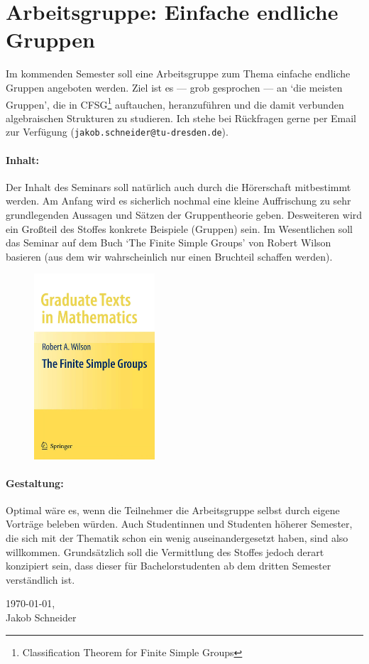 \documentclass{article}
\begin{document}
\section*{Arbeitsgruppe: Einfache endliche Gruppen}

Im kommenden Semester soll eine Arbeitsgruppe zum Thema einfache endliche Gruppen angeboten werden. Ziel ist es --- grob gesprochen --- an `die meisten Gruppen', die in CFSG\footnote{Classification Theorem for Finite Simple Groups}  auftauchen, heranzuführen und die damit verbunden algebraischen Strukturen zu studieren.
Ich stehe bei Rückfragen gerne per Email zur Verfügung ({\tt jakob.schneider@tu-dresden.de}).

\paragraph{Inhalt:} Der Inhalt des Seminars soll natürlich auch durch die Hörerschaft mitbestimmt werden.
Am Anfang wird es sicherlich nochmal eine kleine Auffrischung zu sehr grundlegenden Aussagen und Sätzen der Gruppentheorie geben.
Desweiteren wird ein Großteil des Stoffes konkrete Beispiele (Gruppen) sein. Im Wesentlichen soll das Seminar auf dem Buch `The Finite Simple Groups' von Robert Wilson
basieren (aus dem wir wahrscheinlich nur einen Bruchteil schaffen werden).

\begin{figure}[htb]
    \centering
    \includegraphics[width=0.4\textwidth]{FSG.jpg}
\end{figure}

\paragraph{Gestaltung:} Optimal wäre es, wenn die Teilnehmer die Arbeitsgruppe selbst durch eigene Vorträge beleben würden.
Auch Studentinnen und Studenten höherer Semester, die sich mit der Thematik schon ein wenig auseinandergesetzt haben, sind also willkommen.
Grundsätzlich soll die Vermittlung des Stoffes jedoch derart konzipiert sein, dass dieser für Bachelorstudenten ab dem dritten Semester verständlich ist.

\begin{flushright}
    \today,\\
    Jakob Schneider  
\end{flushright}
\end{document}
